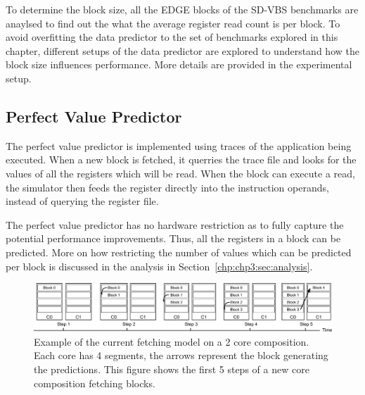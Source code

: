 To determine the block size, all the EDGE blocks of the SD-VBS benchmarks are anaylsed to find out the what the average register read count is per block.
To avoid overfitting the data predictor to the set of benchmarks explored in this chapter, different setups of the data predictor are explored to understand how the block size influences performance.
More details are provided in the experimental setup.

\subsection{Perfect Value Predictor}

The perfect value predictor is implemented using traces of the application being executed.
When a new block is fetched, it querries the trace file and looks for the values of all the registers which will be read.
When the block can execute a read, the simulator then feeds the register directly into the instruction operands, instead of querying the register file.

The perfect value predictor has no hardware restriction as to fully capture the potential performance improvements.
Thus, all the registers in a block can be predicted.
More on how restricting the number of values which can be predicted per block is discussed in the analysis in Section~\ref{chp:chp3:sec:analysis}.

\begin{figure}[t]
    \centering
    \includegraphics[width=1\textwidth]{chapter3/graphics/normfetch.pdf}
    \caption{Example of the current fetching model on a 2 core composition. Each core has 4 segments, the arrows represent the block generating the predictions. This figure shows the first 5 steps of a new core composition fetching blocks.}
    \label{fig:old_fetch}
\vspace{1em}
\end{figure}
